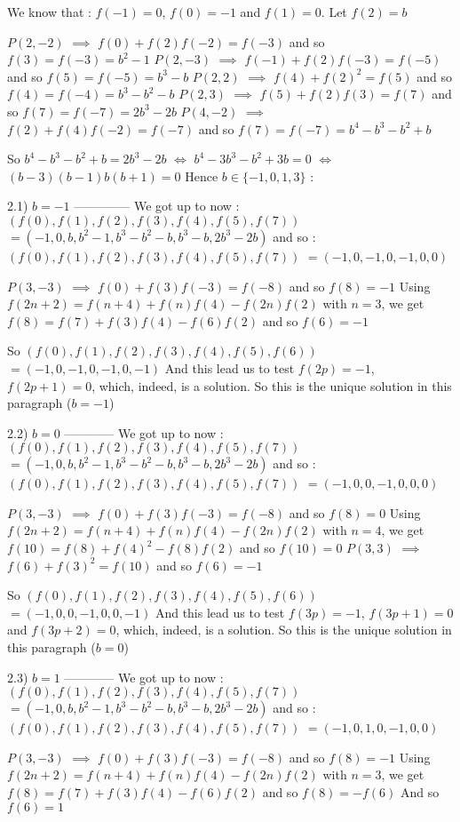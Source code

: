 \begin{solution}
We know that : $ f(-1)=0$, $ f(0)=-1$ and $ f(1)=0$. Let $ f(2)=b$


$ P(2,-2)$ $ \implies$ $ f(0)+f(2)f(-2)=f(-3)$ and so $ f(3)=f(-3)=b^2-1$
$ P(2,-3)$ $ \implies$ $ f(-1)+f(2)f(-3)=f(-5)$ and so $ f(5)=f(-5)=b^3-b$
$ P(2,2)$ $ \implies$ $ f(4)+f(2)^2=f(5)$ and so $ f(4)=f(-4)=b^3-b^2-b$
$ P(2,3)$ $ \implies$ $ f(5)+f(2)f(3)=f(7)$ and so $ f(7)=f(-7)=2b^3-2b$
$ P(4,-2)$ $ \implies$ $ f(2)+f(4)f(-2)=f(-7)$ and so $ f(7)=f(-7)=b^4-b^3-b^2+b$

So $ b^4-b^3-b^2+b=2b^3-2b$ $ \iff$ $ b^4-3b^3-b^2+3b=0$ $ \iff$ $ (b-3)(b-1)b(b+1)=0$ Hence $ b\in\{-1,0,1,3\}$ :

2.1) $ b=-1$
--------------
We got up to now : $ (f(0),f(1),f(2),f(3),f(4),f(5),f(7))$ $ =(-1,0,b,b^2-1,b^3-b^2-b,b^3-b,2b^3-2b)$ and so :
$ (f(0),f(1),f(2),f(3),f(4),f(5),f(7))$ $ =(-1,0,-1,0,-1,0,0)$

$ P(3,-3)$ $ \implies$ $ f(0)+f(3)f(-3)=f(-8)$ and so $ f(8)=-1$
Using $ f(2n+2)=f(n+4)+f(n)f(4)-f(2n)f(2)$ with $ n=3$, we get $ f(8)=f(7)+f(3)f(4)-f(6)f(2)$ and so $ f(6)=-1$ 

So $ (f(0),f(1),f(2),f(3),f(4),f(5),f(6))$ $ =(-1,0,-1,0,-1,0,-1)$
And this lead us to test $ f(2p)=-1$, $ f(2p+1)=0$, which, indeed, is a solution.
So this is the unique solution in this paragraph ($ b=-1$)


2.2) $ b=0$
------------
We got up to now : $ (f(0),f(1),f(2),f(3),f(4),f(5),f(7))$ $ =(-1,0,b,b^2-1,b^3-b^2-b,b^3-b,2b^3-2b)$ and so :
$ (f(0),f(1),f(2),f(3),f(4),f(5),f(7))$ $ =(-1,0,0,-1,0,0,0)$

$ P(3,-3)$ $ \implies$ $ f(0)+f(3)f(-3)=f(-8)$ and so $ f(8)=0$
Using $ f(2n+2)=f(n+4)+f(n)f(4)-f(2n)f(2)$ with $ n=4$, we get $ f(10)=f(8)+f(4)^2-f(8)f(2)$ and so $ f(10)=0$
$ P(3,3)$ $ \implies$ $ f(6)+f(3)^2=f(10)$ and so $ f(6)=-1$

So $ (f(0),f(1),f(2),f(3),f(4),f(5),f(6))$ $ =(-1,0,0,-1,0,0,-1)$
And this lead us to test $ f(3p)=-1$, $ f(3p+1)=0$ and $ f(3p+2)=0$, which, indeed, is a solution.
So this is the unique solution in this paragraph ($ b=0$)

2.3) $ b=1$
------------
We got up to now : $ (f(0),f(1),f(2),f(3),f(4),f(5),f(7))$ $ =(-1,0,b,b^2-1,b^3-b^2-b,b^3-b,2b^3-2b)$ and so :
$ (f(0),f(1),f(2),f(3),f(4),f(5),f(7))$ $ =(-1,0,1,0,-1,0,0)$

$ P(3,-3)$ $ \implies$ $ f(0)+f(3)f(-3)=f(-8)$ and so $ f(8)=-1$
Using $ f(2n+2)=f(n+4)+f(n)f(4)-f(2n)f(2)$ with $ n=3$, we get $ f(8)=f(7)+f(3)f(4)-f(6)f(2)$ and so $ f(8)=-f(6)$
And so $ f(6)=1$


\end{solution}
